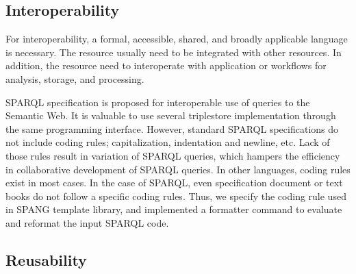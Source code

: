 \documentclass[runningheads]{llncs}
\begin{document}
\subsection{Interoperability}
For interoperability, a formal, accessible, shared, and broadly applicable language is necessary.
The resource usually need to be integrated with other resources. 
In addition, the resource need to interoperate with application or workflows for analysis, storage, and processing.

SPARQL specification is proposed for interoperable use of queries to the Semantic Web. 
It is valuable to use several triplestore implementation through the same programming interface. 
However, standard SPARQL specifications do not include coding rules; capitalization, indentation and newline, etc. 
Lack of those rules result in variation of SPARQL queries, which hampers the efficiency in collaborative development of SPARQL queries. 
In other languages, coding rules exist in most cases. 
In the case of SPARQL, even specification document or text books do not follow a specific coding rules. 
Thus, we specify the coding rule used in SPANG template library, and implemented a formatter command to evaluate and reformat the input SPARQL code.

\subsection{Reusability}

\end{document}
